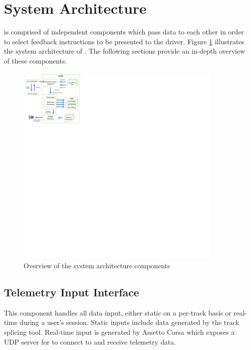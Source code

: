 \section{System Architecture}
\label{sec:imp-systemArchitecture}
\methodname is comprised of independent components which pass data to each other in order to select feedback instructions to be presented to the driver. Figure \ref{fig:SystemArch} illustrates the system architecture of \methodname. The following sections provide an in-depth overview of these components.

\begin{figure}[!htb]
	\centering
	\includegraphics[height=10cm]{diagrams/SystemArch}
	\caption{Overview of the system architecture components}
	\label{fig:SystemArch}
\end{figure}

\subsection{Telemetry Input Interface}
This component handles all data input, either static on a per-track basis or real-time during a user's session. Static inputs include data generated by the track splicing tool. Real-time input is generated by Assetto Corsa which exposes a UDP server for \methodname to connect to and receive telemetry data.

